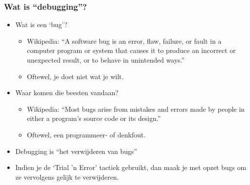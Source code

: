 \begin{frame}
\frametitle{Wat is ``debugging''?}

\begin{itemize}
  \item<1-> Wat is een `bug'?
  \begin{itemize}
    \item<2-> Wikipedia: ``A software bug is an error, flaw, failure, or fault in a computer program or system
      that causes it to produce an incorrect or unexpected result, or to behave in unintended ways.''
    \item<3-> Oftewel, je  doet niet wat je wilt.
  \end{itemize}
  \item<4-> Waar komen die beesten vandaan?
  \begin{itemize}
    \item<5-> Wikipedia: ``Most bugs arise from mistakes and errors made by people in either a program's source code or its design.''
    \item<6-> Oftewel, een programmeer- of denkfout.
  \end{itemize}
  \item<7-> Debugging is ``het verwijderen van bugs''
  \item<8-> Indien je de `Trial 'n Error' tactiek gebruikt, dan maak je met opzet bugs om ze vervolgens gelijk te verwijderen.
\end{itemize}



\end{frame}
